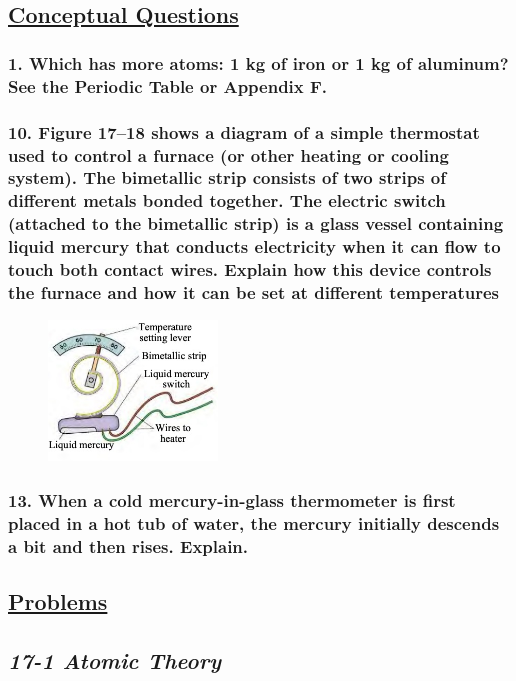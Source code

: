 \documentclass{article}
\title{
    \vspace{2in}
    \textmd{\textbf{\hmwkTitle}}\\
    \vspace{0.5in}
    \textmd{\textbf{\hmwkClass}}\\
    \vspace{4in}
}
\author{\hmwkAuthorName}
\date{}
\begin{document}
\maketitle
\newpage
\begin{center}
    \section*{\textbf{\underline {Conceptual Questions}}}
\end{center}
\subsubsection*{
    1. Which has more atoms: 1 kg of iron or 1 kg of aluminum?
    See the Periodic Table or Appendix F. 
}
\subsubsection*{
    10. Figure 17–18 shows a diagram of a simple \textbf{thermostat} used
    to control a furnace (or other heating or cooling system). The
    bimetallic strip consists of two strips of different metals bonded
    together. The electric switch (attached to the bimetallic strip) is
    a glass vessel containing liquid mercury that conducts electricity 
    when it can flow to touch both contact wires. Explain how this device
    controls the furnace and how it can be set at different temperatures
}
\begin{figure}[h]
    \begin{center}
        \includegraphics[width=0.4\textwidth]{figures/q10.jpg}
    \end{center}
\end{figure}
\subsubsection*{
    13. When a cold mercury-in-glass thermometer is first placed in a hot
    tub of water, the mercury initially descends a bit and then rises. Explain.
}
\newpage
\begin{center}
    \section*{\textbf{\underline {Problems}}}
\end{center}
\begin{center}
    \subsection*{\textbf{\textit{17-1 Atomic Theory}}}
\end{center}
\end{document}
